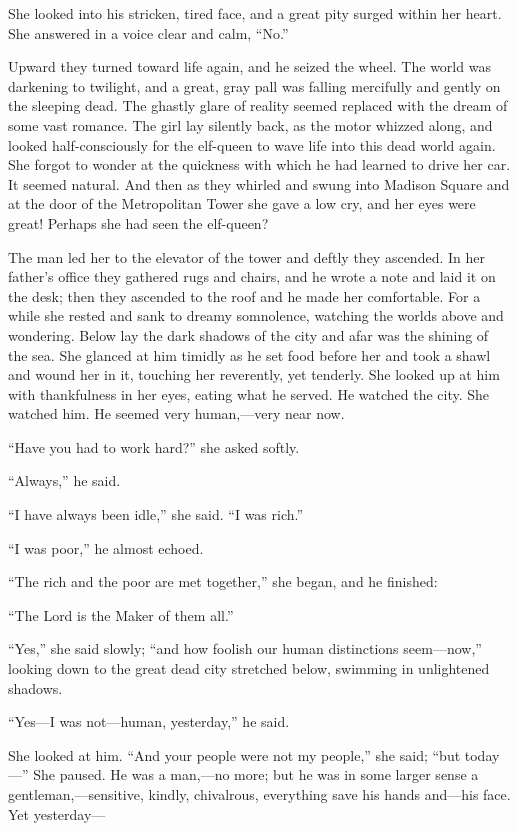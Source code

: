 She looked into his stricken, tired face, and a great pity
surged within her heart. She answered in a voice clear and calm,
``No.''

Upward they turned toward life again, and he seized the wheel.
The world was darkening to twilight, and a great, gray pall was
falling mercifully and gently on the sleeping dead. The ghastly
glare of reality seemed replaced with the dream of some vast
romance. The girl lay silently back, as the motor whizzed along,
and looked half-consciously for the elf-queen to wave life into
this dead world again. She forgot to wonder at the quickness
with which he had learned to drive her car. It seemed natural.
And then as they whirled and swung into Madison Square and at
the door of the Metropolitan Tower she gave a low cry, and her
eyes were great! Perhaps she had seen the elf-queen?

The man led her to the elevator of the tower and deftly they
ascended. In her father's office they gathered rugs and chairs,
and he wrote a note and laid it on the desk; then they ascended
to the roof and he made her comfortable. For a while she rested
and sank to dreamy somnolence, watching the worlds above and
wondering. Below lay the dark shadows of the city and afar was
the shining of the sea. She glanced at him timidly as he set
food before her and took a shawl and wound her in it, touching
her reverently, yet tenderly. She looked up at him with
thankfulness in her eyes, eating what he served. He watched the
city. She watched him. He seemed very human,---very near now.

``Have you had to work hard?'' she asked softly.

``Always,'' he said.

``I have always been idle,'' she said. ``I was rich.''

``I was poor,'' he almost echoed.

``The rich and the poor are met together,'' she began, and he
finished:

``The Lord is the Maker of them all.''

``Yes,'' she said slowly; ``and how foolish our human distinctions
seem---now,'' looking down to the great dead city stretched below,
swimming in unlightened shadows.

``Yes---I was not---human, yesterday,'' he said.

She looked at him. ``And your people were not my people,'' she
said; ``but today---'' She paused. He was a man,---no more; but he
was in some larger sense a gentleman,---sensitive, kindly,
chivalrous, everything save his hands and---his face. Yet
yesterday---

